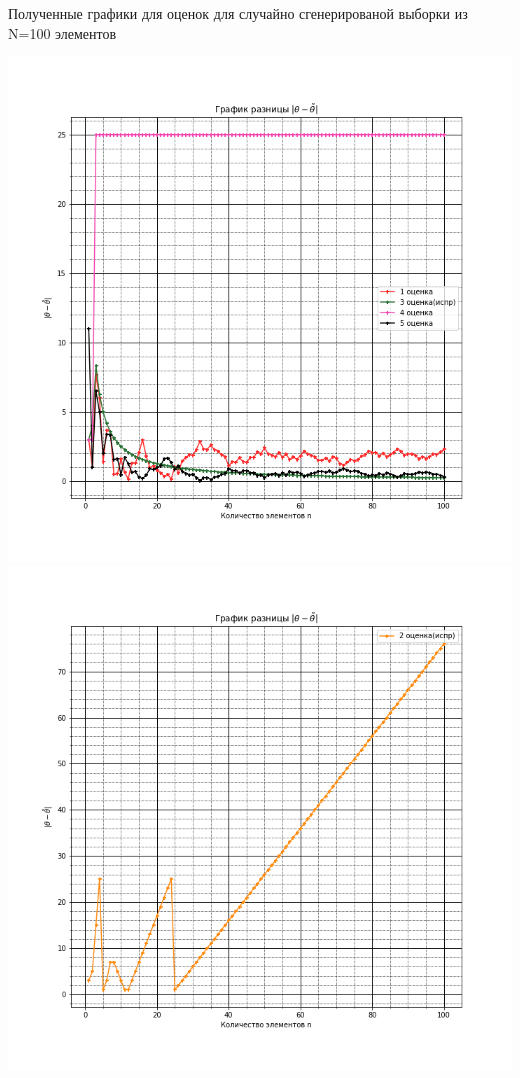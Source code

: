 Полученные графики для оценок для случайно сгенерированой выборки из N=100 элементов
\begin{center}
    \includegraphics[width=1.1\textwidth]{images/ex_1/1.png}
    \includegraphics[width=1.1\textwidth]{images/ex_1/2.png}
\end{center}
\newpage